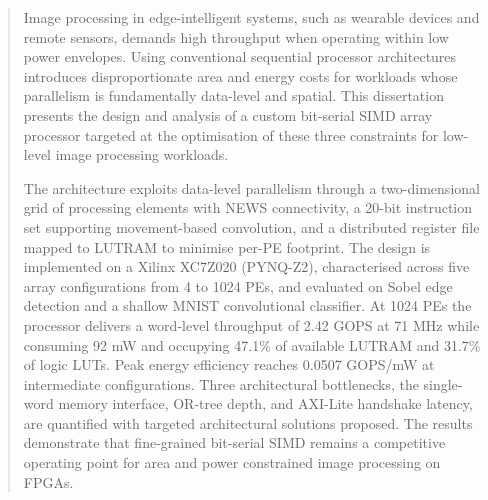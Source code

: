 \uomtoc


\begin{abstract} %

    Image processing in edge-intelligent systems, such as wearable devices and remote sensors, demands high throughput when operating within low power envelopes. Using conventional sequential processor architectures introduces disproportionate area and energy costs for workloads whose parallelism is fundamentally data-level and spatial. This dissertation presents the design and analysis of a custom bit-serial SIMD array processor targeted at the optimisation of these three constraints for low-level image processing workloads.
    
    The architecture exploits data-level parallelism through a two-dimensional grid of processing elements with NEWS connectivity, a 20-bit instruction set supporting movement-based convolution, and a distributed register file mapped to LUTRAM to minimise per-PE footprint. The design is implemented on a Xilinx XC7Z020 (PYNQ-Z2), characterised across five array configurations from 4 to 1024 PEs, and evaluated on Sobel edge detection and a shallow MNIST convolutional classifier. At 1024 PEs the processor delivers a word-level throughput of 2.42 GOPS at 71 MHz while consuming 92 mW and occupying 47.1\% of available LUTRAM and 31.7\% of logic LUTs. Peak energy efficiency reaches 0.0507 GOPS/mW at intermediate configurations. Three architectural bottlenecks, the single-word memory interface, OR-tree depth, and AXI-Lite handshake latency, are quantified with targeted architectural solutions proposed. The results demonstrate that fine-grained bit-serial SIMD remains a competitive operating point for area and power constrained image processing on FPGAs.

\end{abstract}%
\clearpage

\uomlof

\uomlot

\clearpage
{}
{}
